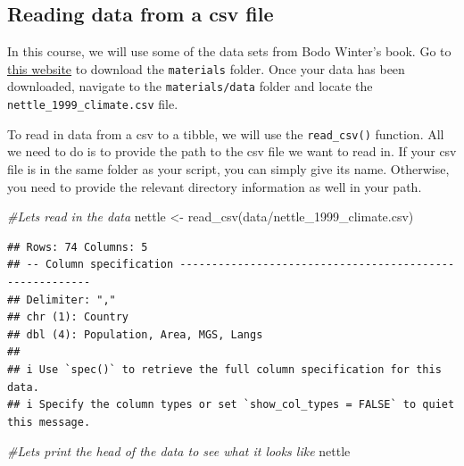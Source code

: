 \documentclass[
]{book}
\newenvironment{Shaded}{\begin{snugshade}}{\end{snugshade}}
\newcommand{\CommentTok}[1]{\textcolor[rgb]{0.56,0.35,0.01}{\textit{#1}}}
\newcommand{\FunctionTok}[1]{\textcolor[rgb]{0.00,0.00,0.00}{#1}}
\newcommand{\NormalTok}[1]{#1}
\newcommand{\OtherTok}[1]{\textcolor[rgb]{0.56,0.35,0.01}{#1}}
\newcommand{\StringTok}[1]{\textcolor[rgb]{0.31,0.60,0.02}{#1}}
\begin{document}
\hypertarget{reading-data-from-a-csv-file}{%
\subsection{Reading data from a csv file}\label{reading-data-from-a-csv-file}}

In this course, we will use some of the data sets from Bodo Winter's book. Go to \href{https://osf.io/34mq9/}{this website} to download the \texttt{materials} folder. Once your data has been downloaded, navigate to the \texttt{materials/data} folder and locate the \texttt{nettle\_1999\_climate.csv} file.

To read in data from a csv to a tibble, we will use the \texttt{read\_csv()} function. All we need to do is to provide the path to the csv file we want to read in. If your csv file is in the same folder as your script, you can simply give its name. Otherwise, you need to provide the relevant directory information as well in your path.

\begin{Shaded}
\begin{Highlighting}[]
\CommentTok{\#Let\textquotesingle{}s read in the data}
\NormalTok{nettle }\OtherTok{\textless{}{-}} \FunctionTok{read\_csv}\NormalTok{(}\StringTok{\textquotesingle{}data/nettle\_1999\_climate.csv\textquotesingle{}}\NormalTok{)}
\end{Highlighting}
\end{Shaded}

\begin{verbatim}
## Rows: 74 Columns: 5
## -- Column specification --------------------------------------------------------
## Delimiter: ","
## chr (1): Country
## dbl (4): Population, Area, MGS, Langs
## 
## i Use `spec()` to retrieve the full column specification for this data.
## i Specify the column types or set `show_col_types = FALSE` to quiet this message.
\end{verbatim}

\begin{Shaded}
\begin{Highlighting}[]
\CommentTok{\#Let\textquotesingle{}s print the head of the data to see what it looks like}
\NormalTok{nettle}
\end{Highlighting}
\end{Shaded}
\end{document}
